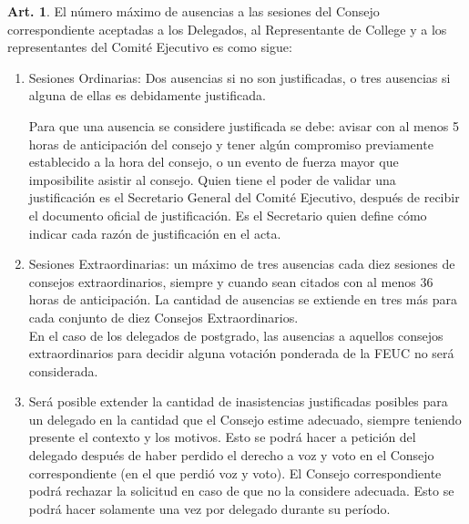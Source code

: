 \documentclass[letterpaper,11pt]{article}
\theoremstyle{definition}%
\newtheorem{art}{Art.} %
\begin{document}
\begin{art}\label{maxAusencias}
	El número máximo de ausencias a las sesiones del Consejo correspondiente aceptadas a los Delegados, al Representante de College y a los representantes del Comité Ejecutivo es como sigue:
	\begin{enumerate}
		\item \label{ausencias_A} Sesiones Ordinarias: Dos ausencias si no son justificadas, o tres ausencias si alguna de ellas es debidamente justificada.

		      Para que una ausencia se considere justificada se debe: avisar con al menos 5 horas de anticipación del consejo y tener algún compromiso previamente establecido a la hora del consejo, o un evento de fuerza mayor que imposibilite asistir al consejo.
		      Quien tiene el poder de validar una justificación es el Secretario General del Comité Ejecutivo, después de recibir el documento oficial de justificación. Es el Secretario quien define cómo indicar cada razón de justificación en el acta.

		\item \label{ausencias_B} Sesiones Extraordinarias: un máximo de tres ausencias cada diez sesiones de consejos extraordinarios, siempre y cuando sean citados con al menos 36 horas de anticipación. La cantidad de ausencias se extiende en tres más para cada conjunto de diez Consejos Extraordinarios. \\
		      En el caso de los delegados de postgrado, las ausencias a aquellos consejos extraordinarios para decidir alguna votación ponderada de la FEUC no será considerada.

		\item \label{extension_ausencias}
		      Será posible extender la cantidad de inasistencias justificadas posibles para un delegado en la cantidad que el Consejo estime adecuado, siempre teniendo presente el contexto y los motivos. Esto se podrá hacer a petición del delegado después de haber perdido el derecho a voz y voto en el Consejo correspondiente (en el que perdió voz y voto). El Consejo correspondiente podrá rechazar la solicitud en caso de que no la considere adecuada. Esto se podrá hacer solamente una vez por delegado durante su período.

	\end{enumerate}


\end{art}
\end{document}
